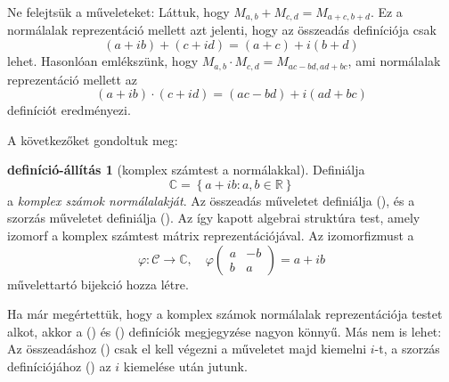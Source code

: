 \documentclass[a4paper, showtrims]{memoir}
\theoremstyle{plain}
\theoremstyle{remark}
\theoremstyle{definition}
\newtheorem{defprop}[proposition]{definíció-állítás}
\begin{document}
Ne felejtsük a műveleteket:
Láttuk, hogy $M_{a,b}+M_{ c,d}=M_{a+c,b+d}$.
Ez a normálalak reprezentáció mellett azt jelenti, hogy az összeadás definíciója csak
\[
	(a+ib)+(c+id)=(a+c)+i(b+d)\tag{\dag}
\]
lehet.
Hasonlóan emlékszünk, hogy
\begin{math}
	M_{a,b}\cdot M_{c,d}=M_{ac-bd,ad+bc}
\end{math},
ami normálalak reprezentáció mellett az
\[
	(a+ib)\cdot (c+id)=(ac-bd)+i(ad+bc)\tag{\ddag}
\]
definíciót eredményezi.

A következőket gondoltuk meg:
\begin{defprop}[komplex számtest a normálakkal]
	Definiálja
	\[
		\mathbb{C}
		=
		\left\{
		a+ib:a,b\in\mathbb{R}
		\right\}
	\]
	a \emph{komplex számok normálalakját}.
	Az összeadás műveletet definiálja (\dag), és a szorzás műveletet definiálja (\ddag).
	Az így kapott algebrai struktúra test, amely izomorf a komplex számtest mátrix reprezentációjával.
	Az izomorfizmust a
	\[
		\varphi:\mathcal{C}\to\mathbb{C},\quad
		\varphi
		\left(
		\begin{matrix}
				a & -b \\
				b & a
			\end{matrix}
		\right)
		=
		a+ib
	\]
	művelettartó bijekció hozza létre.
\end{defprop}

Ha már megértettük, hogy a komplex számok normálalak reprezentációja testet alkot,
akkor a (\dag) és (\ddag) definíciók megjegyzése nagyon könnyű.
Más nem is lehet:
Az összeadáshoz (\dag) csak el kell végezni a műveletet majd kiemelni $i$-t,
a szorzás definíciójához (\ddag)
az $i$ kiemelése után jutunk.
\end{document}
